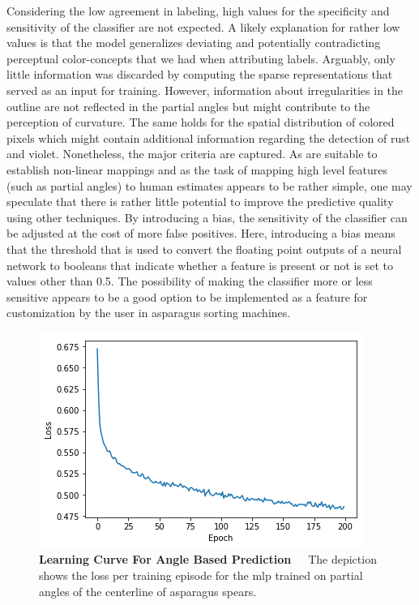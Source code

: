 Considering the low agreement in labeling, high values for the specificity and sensitivity of the classifier are not expected. A likely explanation for rather low values is that the model generalizes deviating and potentially contradicting perceptual color-concepts that we had when attributing labels. Arguably, only little information was discarded by computing the sparse representations that served as an input for training. However, information about irregularities in the outline are not reflected in the partial angles but might contribute to the perception of curvature. The same holds for the spatial distribution of colored pixels which might contain additional information regarding the detection of rust and violet. Nonetheless, the major criteria are captured. As  are suitable to establish non-linear mappings and as the task of mapping high level features (such as partial angles) to human estimates appears to be rather simple, one may speculate that there is rather little potential to improve the predictive quality using other techniques. By introducing a bias, the sensitivity of the classifier can be adjusted at the cost of more false positives. Here, introducing a bias means that the threshold that is used to convert the floating point outputs of a neural network to booleans that indicate whether a feature is present or not is set to values other than 0.5. The possibility of making the classifier more or less sensitive appears to be a good option to be implemented as a feature for customization by the user in asparagus sorting machines.

\begin{figure}[!hb]
    \centering
    \includegraphics[scale=0.7]{Figures/chapter04/fe_curve.png}
    \decoRule
    \caption[Feature Engineering Learning Curve For Angle Based Prediction]{\textbf{Learning Curve For Angle Based Prediction}~~~The depiction shows the loss per training episode for the \acrshort{mlp} trained on partial angles of the centerline of asparagus spears.}
    \label{fig:FeatureEngineeringCurve}
\end{figure}

